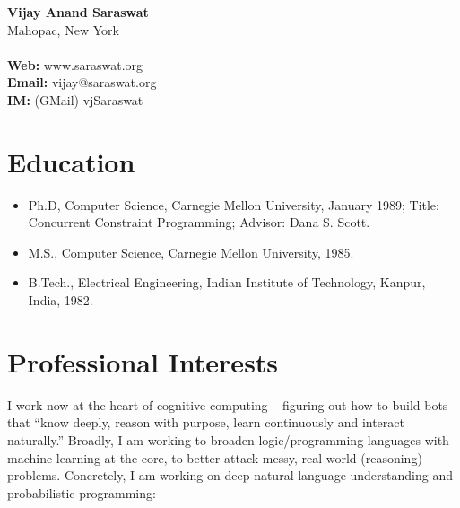 \documentclass{article}
\begin{document}

\begin{center}
{\bf \sc Vijay Anand Saraswat}\\
Mahopac, New York\\
\quad\\
\textbf{Web:} www.saraswat.org\\
\textbf{Email:} vijay@saraswat.org\\
\textbf{IM:} (GMail) vjSaraswat\\
\end{center}

\section*{Education}
\begin{itemize}
\item Ph.D, Computer Science, Carnegie Mellon University, January 1989;
   Title: Concurrent Constraint Programming;
   Advisor: Dana S. Scott.

\item M.S., Computer Science, Carnegie Mellon University, 1985.

\item B.Tech., Electrical Engineering, Indian Institute of Technology,
   Kanpur, India, 1982.
\end{itemize}

\section*{Professional Interests}

I work now at the heart of cognitive computing -- figuring out how to 
build bots that ``know deeply, reason with purpose, learn continuously
and interact naturally.'' Broadly, I am working to broaden logic/programming languages with
machine learning at the core, to better attack messy, real world
(reasoning) problems.  Concretely, I am working on deep natural
language understanding and probabilistic programming: 
\end{document}
